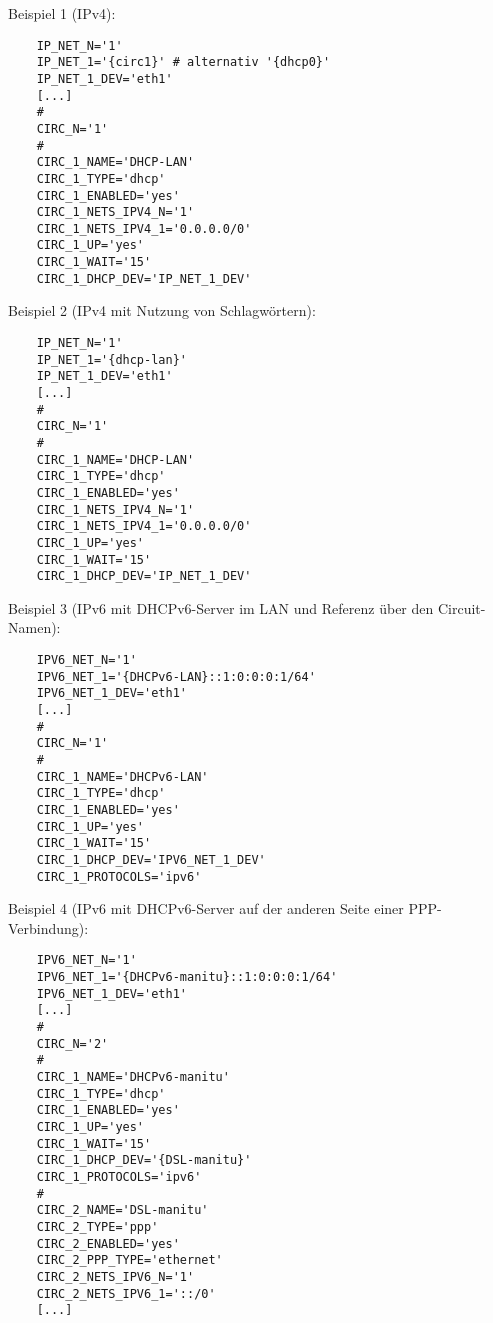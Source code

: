 Beispiel 1 (IPv4):

\begin{example}
\begin{verbatim}
    IP_NET_N='1'
    IP_NET_1='{circ1}' # alternativ '{dhcp0}'
    IP_NET_1_DEV='eth1'
    [...]
    #
    CIRC_N='1'
    #
    CIRC_1_NAME='DHCP-LAN'
    CIRC_1_TYPE='dhcp'
    CIRC_1_ENABLED='yes'
    CIRC_1_NETS_IPV4_N='1'
    CIRC_1_NETS_IPV4_1='0.0.0.0/0'
    CIRC_1_UP='yes'
    CIRC_1_WAIT='15'
    CIRC_1_DHCP_DEV='IP_NET_1_DEV'
\end{verbatim}
\end{example}

Beispiel 2 (IPv4 mit Nutzung von Schlagwörtern):

\begin{example}
\begin{verbatim}
    IP_NET_N='1'
    IP_NET_1='{dhcp-lan}'
    IP_NET_1_DEV='eth1'
    [...]
    #
    CIRC_N='1'
    #
    CIRC_1_NAME='DHCP-LAN'
    CIRC_1_TYPE='dhcp'
    CIRC_1_ENABLED='yes'
    CIRC_1_NETS_IPV4_N='1'
    CIRC_1_NETS_IPV4_1='0.0.0.0/0'
    CIRC_1_UP='yes'
    CIRC_1_WAIT='15'
    CIRC_1_DHCP_DEV='IP_NET_1_DEV'
\end{verbatim}
\end{example}

Beispiel 3 (IPv6 mit DHCPv6-Server im LAN und Referenz über den Circuit-Namen):

\begin{example}
\begin{verbatim}
    IPV6_NET_N='1'
    IPV6_NET_1='{DHCPv6-LAN}::1:0:0:0:1/64'
    IPV6_NET_1_DEV='eth1'
    [...]
    #
    CIRC_N='1'
    #
    CIRC_1_NAME='DHCPv6-LAN'
    CIRC_1_TYPE='dhcp'
    CIRC_1_ENABLED='yes'
    CIRC_1_UP='yes'
    CIRC_1_WAIT='15'
    CIRC_1_DHCP_DEV='IPV6_NET_1_DEV'
    CIRC_1_PROTOCOLS='ipv6'
\end{verbatim}
\end{example}

Beispiel 4 (IPv6 mit DHCPv6-Server auf der anderen Seite einer PPP-Verbindung):

\begin{example}
\begin{verbatim}
    IPV6_NET_N='1'
    IPV6_NET_1='{DHCPv6-manitu}::1:0:0:0:1/64'
    IPV6_NET_1_DEV='eth1'
    [...]
    #
    CIRC_N='2'
    #
    CIRC_1_NAME='DHCPv6-manitu'
    CIRC_1_TYPE='dhcp'
    CIRC_1_ENABLED='yes'
    CIRC_1_UP='yes'
    CIRC_1_WAIT='15'
    CIRC_1_DHCP_DEV='{DSL-manitu}'
    CIRC_1_PROTOCOLS='ipv6'
    #
    CIRC_2_NAME='DSL-manitu'
    CIRC_2_TYPE='ppp'
    CIRC_2_ENABLED='yes'
    CIRC_2_PPP_TYPE='ethernet'
    CIRC_2_NETS_IPV6_N='1'
    CIRC_2_NETS_IPV6_1='::/0'
    [...]
\end{verbatim}
\end{example}

